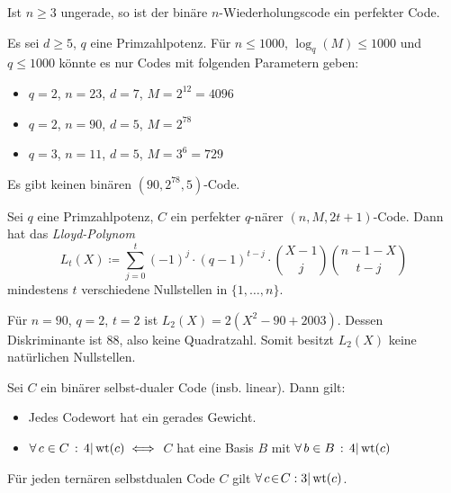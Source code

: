\documentclass{cheat-sheet}
\DeclareMathOperator{\wt}{wt} %
\newcommand{\divides}{|} %
\newcommand{\Golay}{\mathcal{G}} %
\begin{document}
\begin{prop}
  Ist $n \geq 3$ ungerade, so ist der binäre $n$-Wiederholungscode ein perfekter Code.
\end{prop}

\begin{bem}
  Es sei $d \geq 5$, $q$ eine Primzahlpotenz.
  Für $n \leq 1000$, $\log_q(M) \leq 1000$ und $q \leq 1000$ könnte es nur Codes mit folgenden Parametern geben:
  \begin{itemize}
    \item $q=2$, $n=23$, $d=7$, $M=2^{12} = 4096$ %
    \item $q=2$, $n=90$, $d=5$, $M=2^{78}$
    \item $q=3$, $n=11$, $d=5$, $M=3^6=729$ %
  \end{itemize}
\end{bem}

\begin{satz}
  Es gibt keinen binären $(90, 2^{78}, 5)$-Code.
\end{satz}

\begin{bem}
  Sei $q$ eine Primzahlpotenz, $C$ ein perfekter $q$-närer $(n, M, 2t+1)$-Code.
  Dann hat das \emph{Lloyd-Polynom}
  \[ L_t(X) \coloneqq \sum_{j=0}^t (-1)^j \cdot (q-1)^{t-j} \cdot \binom{X-1}{j} \binom{n-1-X}{t-j} \]
  mindestens $t$ verschiedene Nullstellen in $\{ 1, \ldots, n \}$.
\end{bem}

\begin{bsp}
  Für $n=90$, $q=2$, $t=2$ ist $L_2(X) = 2 (X^2 - 90 + 2003)$.
  Dessen Diskriminante ist $88$, also keine Quadratzahl.
  Somit besitzt $L_2(X)$ keine natürlichen Nullstellen.
\end{bsp}

\begin{prop}
  Sei $C$ ein binärer selbst-dualer Code (insb. linear).
  Dann gilt:
  \begin{itemize}
    \item Jedes Codewort hat ein gerades Gewicht.
    \item $\fa{c \in C} 4 \divides \wt(c) \iff$ $C$ hat eine Basis $B$ mit $\fa{b \in B} 4 \divides \wt(c)$
  \end{itemize}
\end{prop}

\begin{prop}
  Für jeden ternären selbstdualen Code $C$ gilt $\fa{c \!\in\! C\!}\! 3 \divides \wt(c)$.
\end{prop}
\end{document}
